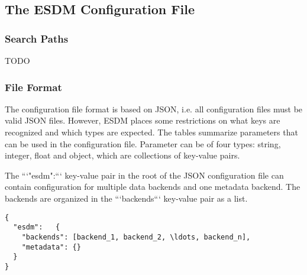 \subsection{The ESDM Configuration File}


\subsubsection{Search Paths}

TODO

\subsubsection{File Format}

The configuration file format is based on JSON, i.e. all configuration files must be valid JSON files.
However, ESDM places some restrictions on what keys are recognized and which types are expected.
The tables summarize parameters that can be used in the configuration file.
Parameter can be of four types: string, integer, float and object, which are collections of key-value pairs.

The ```"esdm":{}``` key-value pair in the root of the JSON configuration file can contain configuration for multiple data backends and one metadata backend.
The backends are organized in the ```backends``` key-value pair as a list.

\begin{lstlisting}
{
  "esdm":	{
    "backends": [backend_1, backend_2, \ldots, backend_n],
    "metadata": {}
  }
}
\end{lstlisting}


